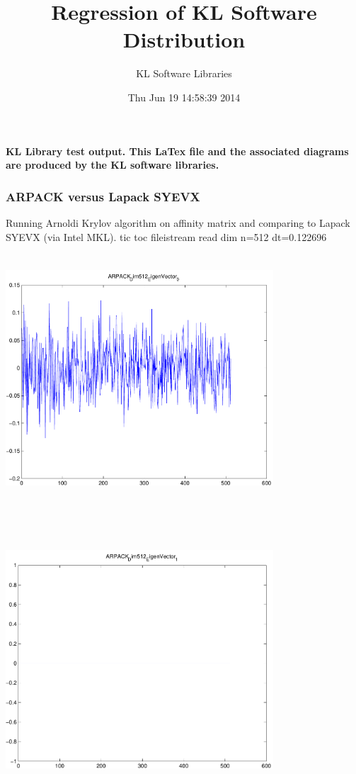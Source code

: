 \documentclass[9pt]{article}
\theoremstyle{plain}
\theoremstyle{definition}
\theoremstyle{remark}
\numberwithin{equation}{section}
\begin{document}
\title{Regression of KL Software Distribution   }
\author{KL Software Libraries}
\date{Thu Jun 19 14:58:39 2014
}
\maketitle
\textbf{ KL Library test output.  This LaTex file and the associated diagrams are produced by the KL software libraries.}
\subsubsection{ARPACK versus Lapack SYEVX}
Running Arnoldi Krylov algorithm on affinity matrix and comparing to Lapack SYEVX (via Intel MKL).
tic toc fileistream read dim n=512 dt=0.122696
\includegraphics[width=10.0cm,height=10.0cm]{ARPACK_Dim512_EigenVector_0.pdf}

\includegraphics[width=10.0cm,height=10.0cm]{ARPACK_Dim512_EigenVector_1.pdf}
\end{document}
